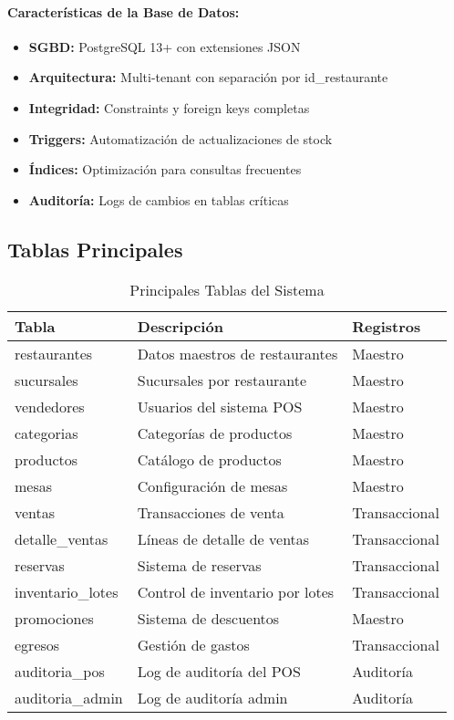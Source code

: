 \documentclass[12pt,a4paper]{article}
\begin{document}
\paragraph{Características de la Base de Datos:}
\begin{itemize}
    \item \textbf{SGBD:} PostgreSQL 13+ con extensiones JSON
    \item \textbf{Arquitectura:} Multi-tenant con separación por id\_restaurante
    \item \textbf{Integridad:} Constraints y foreign keys completas
    \item \textbf{Triggers:} Automatización de actualizaciones de stock
    \item \textbf{Índices:} Optimización para consultas frecuentes
    \item \textbf{Auditoría:} Logs de cambios en tablas críticas
\end{itemize}

\subsection{Tablas Principales}

\begin{table}[H]
\centering
\footnotesize
\begin{longtable}{@{}lp{8cm}l@{}}
\toprule
\textbf{Tabla} & \textbf{Descripción} & \textbf{Registros} \\
\midrule
\endhead
restaurantes & Datos maestros de restaurantes & Maestro \\
sucursales & Sucursales por restaurante & Maestro \\
vendedores & Usuarios del sistema POS & Maestro \\
categorias & Categorías de productos & Maestro \\
productos & Catálogo de productos & Maestro \\
mesas & Configuración de mesas & Maestro \\
ventas & Transacciones de venta & Transaccional \\
detalle\_ventas & Líneas de detalle de ventas & Transaccional \\
reservas & Sistema de reservas & Transaccional \\
inventario\_lotes & Control de inventario por lotes & Transaccional \\
promociones & Sistema de descuentos & Maestro \\
egresos & Gestión de gastos & Transaccional \\
auditoria\_pos & Log de auditoría del POS & Auditoría \\
auditoria\_admin & Log de auditoría admin & Auditoría \\
\bottomrule
\end{longtable}
\caption{Principales Tablas del Sistema}
\end{table}
\end{document}
